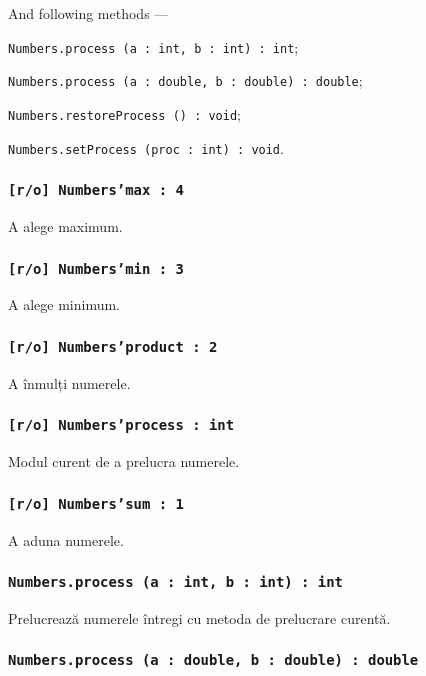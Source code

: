 And following methods —
\begin{icItems}
	\item \texttt{Numbers.process (a : int, b : int) : int};
	\item \texttt{Numbers.process (a : double, b : double) : double};
	\item \texttt{Numbers.restoreProcess () : void};
	\item \texttt{Numbers.setProcess (proc : int) : void}.
\end{icItems}

\subsubsection{\texttt{[r/o] Numbers'max : 4}}

A alege maximum.

\subsubsection{\texttt{[r/o] Numbers'min : 3}}

A alege minimum.

\subsubsection{\texttt{[r/o] Numbers'product : 2}}

A înmulți numerele.

\subsubsection{\texttt{[r/o] Numbers'process : int}}

Modul curent de a prelucra numerele.

\subsubsection{\texttt{[r/o] Numbers'sum : 1}}

A aduna numerele.

\subsubsection{\texttt{Numbers.process (a : int, b : int) : int}}

Prelucrează numerele întregi cu metoda de prelucrare curentă.

\subsubsection{\texttt{Numbers.process (a : double, b : double) : double}}

